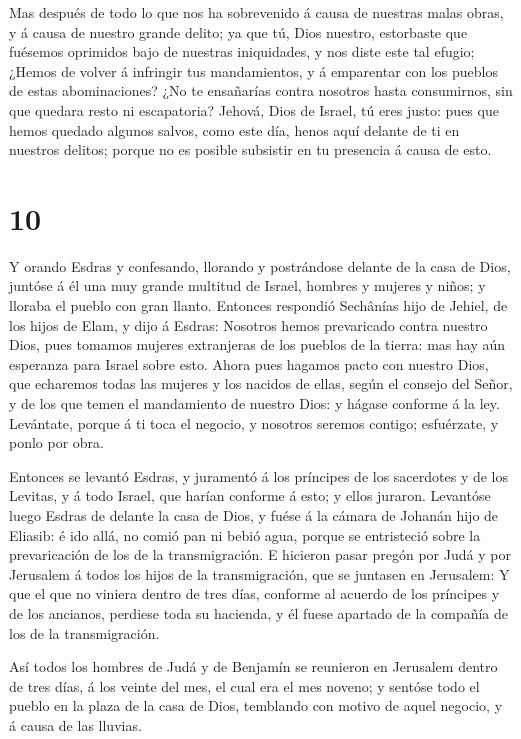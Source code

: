  Mas después de todo lo que nos ha sobrevenido á causa de
nuestras malas obras, y á causa de nuestro grande delito; ya que tú,
Dios nuestro, estorbaste que fuésemos oprimidos bajo de nuestras
iniquidades, y nos diste este tal efugio;  ¿Hemos de volver
á infringir tus mandamientos, y á emparentar con los pueblos de estas
abominaciones? ¿No te ensañarías contra nosotros hasta consumirnos, sin
que quedara resto ni escapatoria?  Jehová, Dios de Israel,
tú eres justo: pues que hemos quedado algunos salvos, como este día,
henos aquí delante de ti en nuestros delitos; porque no es posible
subsistir en tu presencia á causa de esto.

\hypertarget{section-9}{%
\section{10}\label{section-9}}

 Y orando Esdras y confesando, llorando y postrándose
delante de la casa de Dios, juntóse á él una muy grande multitud de
Israel, hombres y mujeres y niños; y lloraba el pueblo con gran llanto.
 Entonces respondió Sechânías hijo de Jehiel, de los hijos
de Elam, y dijo á Esdras: Nosotros hemos prevaricado contra nuestro
Dios, pues tomamos mujeres extranjeras de los pueblos de la tierra: mas
hay aún esperanza para Israel sobre esto.  Ahora pues
hagamos pacto con nuestro Dios, que echaremos todas las mujeres y los
nacidos de ellas, según el consejo del Señor, y de los que temen el
mandamiento de nuestro Dios: y hágase conforme á la ley. 
Levántate, porque á ti toca el negocio, y nosotros seremos contigo;
esfuérzate, y ponlo por obra.

 Entonces se levantó Esdras, y juramentó á los príncipes de
los sacerdotes y de los Levitas, y á todo Israel, que harían conforme á
esto; y ellos juraron.  Levantóse luego Esdras de delante la
casa de Dios, y fuése á la cámara de Johanán hijo de Eliasib: é ido
allá, no comió pan ni bebió agua, porque se entristeció sobre la
prevaricación de los de la transmigración.  E hicieron pasar
pregón por Judá y por Jerusalem á todos los hijos de la transmigración,
que se juntasen en Jerusalem:  Y que el que no viniera
dentro de tres días, conforme al acuerdo de los príncipes y de los
ancianos, perdiese toda su hacienda, y él fuese apartado de la compañía
de los de la transmigración.

 Así todos los hombres de Judá y de Benjamín se reunieron en
Jerusalem dentro de tres días, á los veinte del mes, el cual era el mes
noveno; y sentóse todo el pueblo en la plaza de la casa de Dios,
temblando con motivo de aquel negocio, y á causa de las lluvias.

